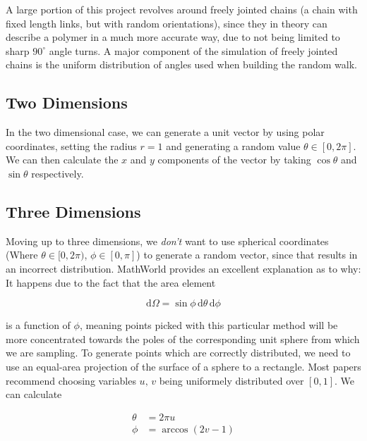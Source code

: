 \documentclass[a4paper,12pt]{article}
\begin{document}
A large portion of this project revolves around freely jointed chains (a chain with fixed length links, but with
random orientations), since they in theory can describe a polymer in a much more accurate way, due to not being
limited to sharp $90^{\circ}$ angle turns. A major component of the simulation of freely jointed chains is the
uniform distribution of angles used when building the random walk.

\subsection*{Two Dimensions}

In the two dimensional case, we can generate a unit vector by using polar coordinates, setting the radius $r = 1$
and generating a random value $\theta \in [0, 2\pi]$. We can then calculate the $x$ and $y$ components of the
vector by taking $\cos \theta$ and $\sin \theta$ respectively.

\subsection*{Three Dimensions}

Moving up to three dimensions, we \emph{don't} want to use spherical coordinates (Where $\theta \in [0, 2\pi)$,
$\phi \in [0, \pi]$) to generate a random vector, since that results in an incorrect distribution. MathWorld
provides an excellent explanation as to why: It happens due to the fact that the area element

\begin{equation*}
  \mathrm{d}\Omega = \sin \phi \, \mathrm{d} \theta \, \mathrm{d} \phi
\end{equation*}

is a function of $\phi$, meaning points picked with this particular method will be more concentrated towards the
poles of the corresponding unit sphere from which we are sampling. To generate points which are correctly
distributed, we need to use an equal-area projection of the surface of a sphere to a rectangle. Most papers
recommend choosing variables $u,\, v$ being uniformely distributed over $[0, 1]$. We can calculate

\begin{equation*}
  \begin{aligned}
    \theta &= 2 \pi u \\
    \phi &= \arccos(2 v - 1)
  \end{aligned}
\end{equation*}
\end{document}
